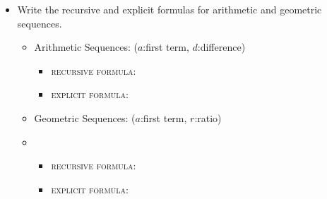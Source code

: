 \begin{itemize}
    \item Write the recursive and explicit formulas for arithmetic and geometric sequences.
    \begin{itemize}
        \item Arithmetic Sequences: ($a$:first term, $d$:difference)
            \begin{itemize}
                \item {\scshape recursive formula}: 
                \item {\scshape explicit formula}: 
            \end{itemize}
        \item Geometric Sequences: ($a$:first term, $r$:ratio)
        \item \begin{itemize}
            \item {\scshape recursive formula}: 
            \item {\scshape explicit formula}: 
    \end{itemize}
    \end{itemize}
\end{itemize}